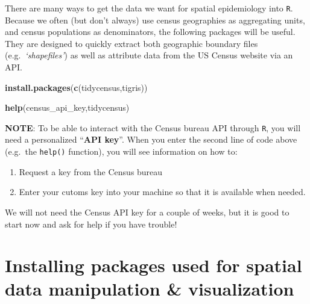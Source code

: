 \documentclass[
]{book}
\newenvironment{Shaded}{\begin{snugshade}}{\end{snugshade}}
\newcommand{\FunctionTok}[1]{\textcolor[rgb]{0.13,0.29,0.53}{\textbf{#1}}}
\newcommand{\NormalTok}[1]{#1}
\newcommand{\StringTok}[1]{\textcolor[rgb]{0.31,0.60,0.02}{#1}}
\providecommand{\tightlist}{%
  \setlength{\itemsep}{0pt}\setlength{\parskip}{0pt}}
\newenvironment{rmdtip}[1]
  {
  \begin{itemize}
  \renewcommand{\labelitemi}{
    \raisebox{-.7\height}[0pt][0pt]{
      {\setkeys{Gin}{width=3em,keepaspectratio}\texttt{[image: images/\#1]}}
    }
  }
  \setlength{\fboxsep}{1em}
  \begin{tip}
  \item
  }
  {
  \end{tip}
  \end{itemize}
  }
\begin{document}
There are many ways to get the data we want for spatial epidemiology into \texttt{R}. Because we often (but don't always) use census geographies as aggregating units, and census populations as denominators, the following packages will be useful. They are designed to quickly extract both geographic boundary files (e.g.~\emph{`shapefiles'}) as well as attribute data from the US Census website via an API.

\begin{Shaded}
\begin{Highlighting}[]
\FunctionTok{install.packages}\NormalTok{(}\FunctionTok{c}\NormalTok{(}\StringTok{\textquotesingle{}tidycensus\textquotesingle{}}\NormalTok{,}\StringTok{\textquotesingle{}tigris\textquotesingle{}}\NormalTok{)) }

\FunctionTok{help}\NormalTok{(}\StringTok{\textquotesingle{}census\_api\_key\textquotesingle{}}\NormalTok{,}\StringTok{\textquotesingle{}tidycensus\textquotesingle{}}\NormalTok{)}
\end{Highlighting}
\end{Shaded}

\begin{rmdtip}{tip}
\textbf{NOTE}: To be able to interact with the Census bureau API through \texttt{R}, you will need a personalized ``\textbf{API key}''. When you enter the second line of code above (e.g.~the \texttt{help()} function), you will see information on how to:

\begin{enumerate}
\def\labelenumi{\arabic{enumi}.}
\tightlist
\item
  Request a key from the Census bureau
\item
  Enter your cutoms key into your machine so that it is available when needed.
\end{enumerate}

We will not need the Census API key for a couple of weeks, but it is good to start now and ask for help if you have trouble!

\end{rmdtip}

\hypertarget{installing-packages-used-for-spatial-data-manipulation-visualization}{%
\section*{Installing packages used for spatial data manipulation \& visualization}\label{installing-packages-used-for-spatial-data-manipulation-visualization}}
\end{document}
